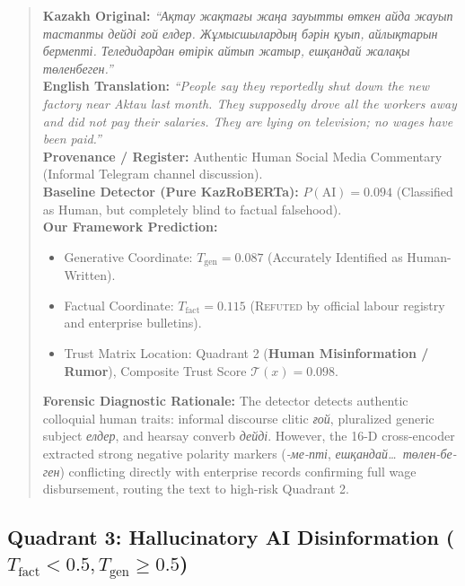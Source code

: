 \begin{quote}
\textbf{Kazakh Original:} \textit{``Ақтау жақтағы жаңа зауытты өткен айда жауып тастапты дейді ғой елдер. Жұмысшылардың бәрін қуып, айлықтарын бермепті. Теледидардан өтірік айтып жатыр, ешқандай жалақы төленбеген.''} \\
\textbf{English Translation:} \textit{``People say they reportedly shut down the new factory near Aktau last month. They supposedly drove all the workers away and did not pay their salaries. They are lying on television; no wages have been paid.''} \\
\textbf{Provenance / Register:} Authentic Human Social Media Commentary (Informal Telegram channel discussion). \\
\textbf{Baseline Detector (Pure KazRoBERTa):} $P(\text{AI}) = 0.094$ (Classified as Human, but completely blind to factual falsehood). \\
\textbf{Our Framework Prediction:}
\begin{itemize}
    \item Generative Coordinate: $T_{\text{gen}} = 0.087$ (Accurately Identified as Human-Written).
    \item Factual Coordinate: $T_{\text{fact}} = 0.115$ (\textsc{Refuted} by official labour registry and enterprise bulletins).
    \item Trust Matrix Location: Quadrant 2 (\textbf{Human Misinformation / Rumor}), Composite Trust Score $\mathcal{T}(x) = 0.098$.
\end{itemize}
\textbf{Forensic Diagnostic Rationale:} The detector detects authentic colloquial human traits: informal discourse clitic \textit{ғой}, pluralized generic subject \textit{елдер}, and hearsay converb \textit{дейді}. However, the 16-D cross-encoder extracted strong negative polarity markers (\textit{-ме-пті}, \textit{ешқандай\dots\ төлен-бе-ген}) conflicting directly with enterprise records confirming full wage disbursement, routing the text to high-risk Quadrant 2.
\end{quote}

\subsection{Quadrant 3: Hallucinatory AI Disinformation \texorpdfstring{($T_{\text{fact}} < 0.5, T_{\text{gen}} \ge 0.5$)}{(T-fact < 0.5, T-gen >= 0.5)}}
\label{sec:app_case_q3}

